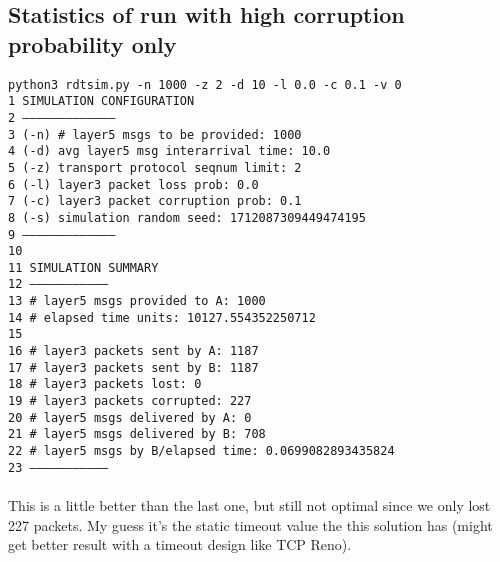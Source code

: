 \documentclass{article}
\begin{document}
\subsection{Statistics of run with high corruption probability only}
\hspace*{10mm} \texttt{python3 rdtsim.py -n 1000 -z 2 -d 10 -l 0.0 -c 0.1 -v 0}
\texttt{\\1 SIMULATION CONFIGURATION\\
2 --------------------------------------\\
3 (-n) \# layer5 msgs to be provided:      1000\\
4 (-d) avg layer5 msg interarrival time:  10.0\\
5 (-z) transport protocol seqnum limit:   2\\
6 (-l) layer3 packet loss prob:           0.0\\
7 (-c) layer3 packet corruption prob:     0.1\\
8 (-s) simulation random seed:            1712087309449474195\\
9 --------------------------------------\\
10 \\
11 SIMULATION SUMMARY\\
12 --------------------------------\\
13 \# layer5 msgs provided to A:      1000\\
14 \# elapsed time units:             10127.554352250712\\
15 \\
16 \# layer3 packets sent by A:       1187\\
17 \# layer3 packets sent by B:       1187\\
18 \# layer3 packets lost:            0\\
19 \# layer3 packets corrupted:       227\\
20 \# layer5 msgs delivered by A:     0\\
21 \# layer5 msgs delivered by B:     708\\
22 \# layer5 msgs by B/elapsed time:  0.0699082893435824\\
23 --------------------------------\\}
\\ This is a little better than the last one, but still not optimal since we
only lost 227 packets. My guess it's the static timeout value the this solution
has (might get better result with a timeout design like TCP Reno).
\\\\
\end{document}
